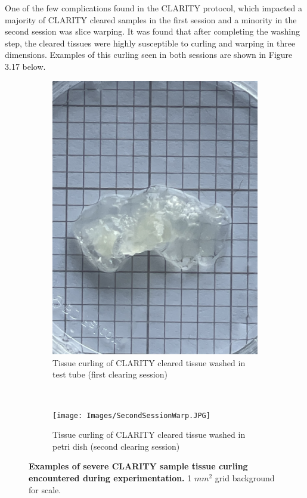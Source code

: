 One of the few complications found in the CLARITY protocol, which impacted a majority of CLARITY cleared samples in the first session and a minority in the second session was slice warping. It was found that after completing the washing step, the cleared tissues were highly susceptible to curling and warping in three dimensions. Examples of this curling seen in both sessions are shown in Figure 3.17 below.


\begin{figure}[H]
    \centering
    
    \begin{subfigure}[t]{0.475\textwidth}
    \centering
    \includegraphics[width=1\linewidth]{Images/FirstSessionWarp.JPG}
    \caption{Tissue curling of CLARITY cleared tissue washed in test tube (first clearing session)}
    \end{subfigure}
    ~
    \begin{subfigure}[t]{0.475\textwidth}
    \centering
    \texttt{[image: Images/SecondSessionWarp.JPG]}
    \caption{Tissue curling of CLARITY cleared tissue washed in petri dish (second clearing session)}
    \end{subfigure}
    \medskip
\caption{\textbf{Examples of severe CLARITY sample tissue curling encountered during experimentation.} 1 $mm^2$ grid background for scale.}
    \label{fig:enter-label}
\end{figure}

